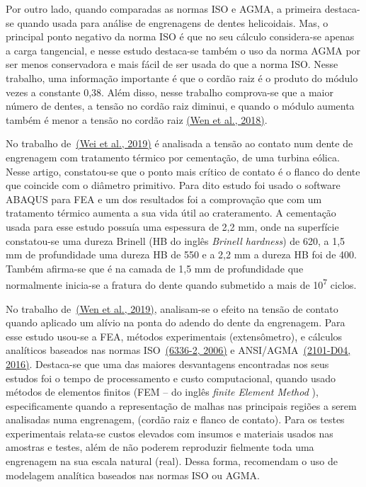 \documentclass[12pt,a4paper]{article}
\begin{document}
Por outro lado, quando comparadas as normas ISO e AGMA, a primeira
destaca-se quando usada para análise de engrenagens de dentes
helicoidais. Mas, o principal ponto negativo da norma ISO é que no seu
cálculo considera-se apenas a carga tangencial, e nesse estudo
destaca-se também o uso da norma AGMA por ser menos conservadora e mais
fácil de ser usada do que a norma ISO. Nesse trabalho, uma informação
importante é que o cordão raiz é o produto do módulo vezes a constante
0,38. Além disso, nesse trabalho comprova-se que a maior número de
dentes, a tensão no cordão raiz diminui, e quando o módulo aumenta
também é menor a tensão no cordão raiz \hyperref[csl:7]{(Wen et al., 2018)}.

No trabalho de~\hyperref[csl:8]{(Wei et al., 2019)} é analisada a tensão ao contato num
dente de engrenagem com tratamento térmico por cementação, de uma
turbina eólica. Nesse artigo, constatou-se que o ponto mais crítico de
contato é o flanco do dente que coincide com o diâmetro primitivo. Para
dito estudo foi usado o software ABAQUS para FEA e um dos resultados foi
a comprovação que com um tratamento térmico aumenta a sua vida útil ao
crateramento. A cementação usada para esse estudo possuía uma espessura
de 2,2 mm, onde na superfície constatou-se uma dureza Brinell (HB do
inglês \emph{Brinell hardness}) de 620, a 1,5 mm de profundidade uma
dureza HB de 550 e a 2,2 mm a dureza HB foi de 400. Também afirma-se que
é na camada de 1,5 mm de profundidade que normalmente inicia-se a
fratura do dente quando submetido a mais de 10\textsuperscript{7}
ciclos.

No trabalho de~\hyperref[csl:9]{(Wen et al., 2019)}, analisam-se o efeito na tensão de
contato quando aplicado um alívio na ponta do adendo do dente da
engrenagem. Para esse estudo usou-se a FEA, métodos experimentais
(extensômetro), e cálculos analíticos baseados nas normas
ISO~\hyperref[csl:10]{(6336-2, 2006)} e ANSI/AGMA~\hyperref[csl:5]{(2101-D04, 2016)}. Destaca-se que
uma das maiores desvantagens encontradas nos seus estudos foi o tempo de
processamento e custo computacional, quando usado métodos de elementos
finitos (FEM -- do inglês \emph{finite Element Method} ),
especificamente quando a representação de malhas nas principais regiões
a serem analisadas numa engrenagem, (cordão raiz e flanco de contato).
Para os testes experimentais relata-se custos elevados com insumos e
materiais usados nas amostras e testes, além de não poderem reproduzir
fielmente toda uma engrenagem na sua escala natural (real). Dessa forma,
recomendam o uso de modelagem analítica baseados nas normas ISO ou AGMA.
\end{document}
